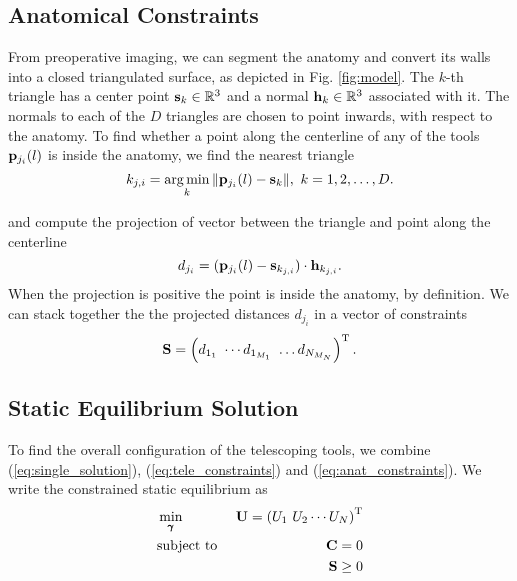 \subsection{Anatomical Constraints}
\label{sec:model:anatomy}
From preoperative imaging, we can segment the anatomy and convert its walls into a closed triangulated surface, as depicted in Fig. \ref{fig:model}. The $k$-th triangle has a center point $\mathbf{s}_k \in \mathbb{R}^3$ and a normal $\mathbf{h}_k \in \mathbb{R}^3$ associated with it. The normals to each of the $D$ triangles are chosen to point inwards, with respect to the anatomy. To find whether a point along the centerline of any of the tools $\mathbf{p}_{j_i}(l)$ is inside the anatomy, we find the nearest triangle 
\begin{equation}
    k_{j,i} = \operatorname*{arg\,min}_{k} \|\mathbf{p}_{j_i}(l) - \mathbf{s}_k\|, \ k = 1, 2, \dots, D.
\end{equation}

and compute the projection of vector between the triangle and point along the centerline
\begin{equation}
    d_{j_i} = (\mathbf{p}_{j_i}(l) - \mathbf{s}_{k_{j,i}}) \cdot \mathbf{h}_{k_{j,i}}.
\end{equation}
When the projection is positive the point is inside the anatomy, by definition. We can stack together the the projected distances $d_{j_i}$ in a vector of constraints 
\begin{equation}
\label{eq:anat_constraints}
    \mathbf{S} = \left(d_{1_1} \ \cdots d_{1_{M_1}} \ \dots d_{N_{M_N}}  \right) ^{\mathrm{T}} .
\end{equation}

\subsection{Static Equilibrium Solution}
\label{sec:model:solution}
To find the overall configuration of the telescoping tools, we combine (\ref{eq:single_solution}), (\ref{eq:tele_constraints}) and (\ref{eq:anat_constraints}). We write the constrained static equilibrium as
\begin{eqnarray}
\label{eq:solution}
        & \displaystyle \min_{\pmb \gamma} & \mb U = \left(U_1 \ U_2 \cdots U_N \right)\T \\
         & \text{subject to } & \mb C = 0 \nonumber \\
        & & \mb S \geq 0 \nonumber
\end{eqnarray}
